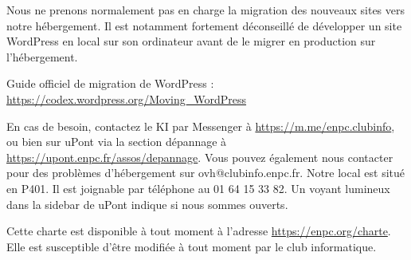 \documentclass{ki019}
\begin{document}
Nous ne prenons normalement pas en charge la migration des nouveaux sites vers notre hébergement.
Il est notamment fortement déconseillé de développer un site WordPress en local sur son ordinateur avant de le migrer en production sur l'hébergement.

Guide officiel de migration de WordPress : \url{https://codex.wordpress.org/Moving_WordPress}


En cas de besoin, contactez le KI par Messenger à \url{https://m.me/enpc.clubinfo}, ou bien sur uPont via la section dépannage à \url{https://upont.enpc.fr/assos/depannage}.
Vous pouvez également nous contacter pour des problèmes d'hébergement sur ovh@clubinfo.enpc.fr.
Notre local est situé en P401. Il est joignable par téléphone au 01 64 15 33 82.
Un voyant lumineux dans la sidebar de uPont indique si nous sommes ouverts.

Cette charte est disponible à tout moment à l'adresse \url{https://enpc.org/charte}. Elle est susceptible d'être modifiée à tout moment par le club informatique.

\Footer{\today}
\end{document}

